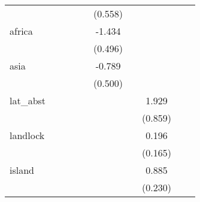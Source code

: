 {\begin{tabular}{l*{9}{c}}
            &                     &                     &                     &                     &     (0.558)         &                     &                     &                     &                     \\
[1em]
africa      &                     &                     &                     &                     &      -1.434\sym{***}&                     &                     &                     &                     \\
            &                     &                     &                     &                     &     (0.496)         &                     &                     &                     &                     \\
[1em]
asia        &                     &                     &                     &                     &      -0.789         &                     &                     &                     &                     \\
            &                     &                     &                     &                     &     (0.500)         &                     &                     &                     &                     \\
[1em]
lat\_abst    &                     &                     &                     &                     &                     &                     &       1.929\sym{**} &                     &                     \\
            &                     &                     &                     &                     &                     &                     &     (0.859)         &                     &                     \\
[1em]
landlock    &                     &                     &                     &                     &                     &                     &       0.196         &                     &                     \\
            &                     &                     &                     &                     &                     &                     &     (0.165)         &                     &                     \\
[1em]
island      &                     &                     &                     &                     &                     &                     &       0.885\sym{***}&                     &                     \\
            &                     &                     &                     &                     &                     &                     &     (0.230)         &                     &                     \\

\end{tabular}}
